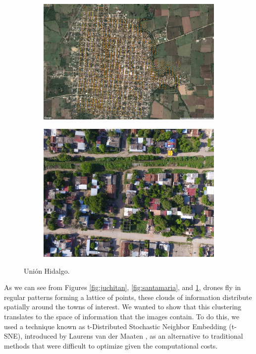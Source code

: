 \begin{figure}[!h]
  \centering
    \begin{subfigure}{.8\textwidth}
        \includegraphics[width=\textwidth]{images/union-satellite.jpg}
    \end{subfigure}
    \begin{subfigure}{.8\textwidth}
        \includegraphics[width=\textwidth]{images/union-sample.jpg}
    \end{subfigure}
  \caption{Uni\'on Hidalgo.}
  \label{fig:union}
\end{figure}

As we can see from Figures \ref{fig:juchitan}, \ref{fig:santamaria}, and \ref{fig:union}, drones fly in regular patterns forming a lattice of points, these clouds of information distribute spatially around the towns of interest. We wanted to show that this clustering translates to the space of information that the images contain. To do this, we used a technique known as t-Distributed Stochastic Neighbor Embedding (t-SNE), introduced by Laurens van der Maaten \cite{t-sne}, as an alternative to traditional methods that were difficult to optimize given the computational costs.\\

